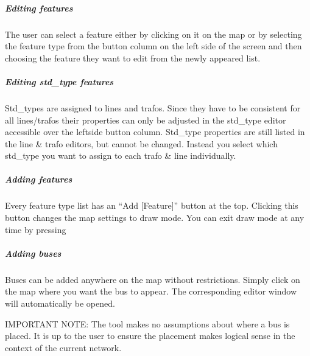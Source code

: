 \documentclass[letterpaper,10pt,english]{sphinxmanual}
\begin{document}
\subparagraph{Editing features}
\label{\detokenize{docs_gui/usage/network_editor:editing-features}}
\begin{DUlineblock}{0em}
\item[] The user can select a feature either by clicking on it on the map or by selecting the feature type from the button column on the left side of the screen and then choosing
the feature they want to edit from the newly appeared list.
\end{DUlineblock}


\subparagraph{Editing std\_type features}
\label{\detokenize{docs_gui/usage/network_editor:editing-std-type-features}}
\begin{DUlineblock}{0em}
\item[] Std\_types are assigned to lines and trafos. Since they have to be consistent for all lines/trafos their properties can only be adjusted in the std\_type editor accessible
over the left\sphinxhyphen{}side button column. Std\_type properties are still listed in the line \& trafo editors, but cannot be changed. Instead you select which std\_type you want to
assign to each trafo \& line individually.
\end{DUlineblock}


\subparagraph{Adding features}
\label{\detokenize{docs_gui/usage/network_editor:adding-features}}
\begin{DUlineblock}{0em}
\item[] Every feature type list has an “Add {[}Feature{]}” button at the top. Clicking this button changes the map settings to draw mode. You can exit draw mode at any time
by pressing 
\end{DUlineblock}


\subparagraph{Adding buses}
\label{\detokenize{docs_gui/usage/network_editor:adding-buses}}
\begin{DUlineblock}{0em}
\item[] Buses can be added anywhere on the map without restrictions. Simply click on the map where you want the bus to appear. The corresponding editor window will
automatically be opened.
\item[] IMPORTANT NOTE: The tool makes no assumptions about where a bus is placed. It is up to the user to ensure the placement makes logical sense in the context of the
current network.
\end{DUlineblock}
\end{document}

